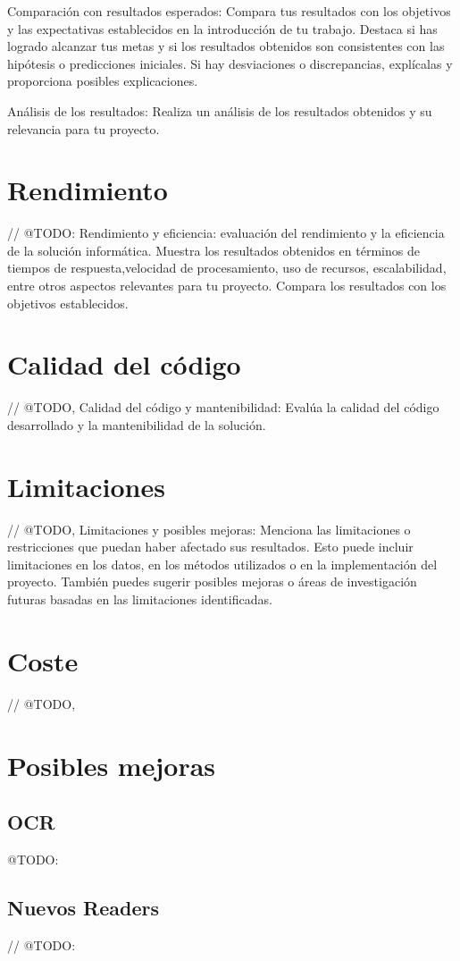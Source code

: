 Comparación con resultados esperados: Compara tus resultados con los objetivos
y las expectativas establecidos en la introducción de tu trabajo.
Destaca si has logrado alcanzar tus metas y si los resultados obtenidos son consistentes con las hipótesis o
predicciones iniciales.
Si hay desviaciones o discrepancias, explícalas y proporciona posibles explicaciones.

Análisis de los resultados: Realiza un análisis de los resultados obtenidos y su relevancia para tu proyecto.


\section{Rendimiento}

// @TODO: Rendimiento y eficiencia: evaluación del rendimiento y la eficiencia de la solución informática.
Muestra los resultados obtenidos en términos de tiempos de respuesta,velocidad de procesamiento, uso de recursos,
escalabilidad, entre otros aspectos relevantes para tu proyecto.
Compara los resultados con los objetivos establecidos.


\section{Calidad del código}

// @TODO, Calidad del código y mantenibilidad:
Evalúa la calidad del código desarrollado y la mantenibilidad de la solución.


\section{Limitaciones}

// @TODO, Limitaciones y posibles mejoras: Menciona las limitaciones o restricciones
que puedan haber afectado sus resultados.
Esto puede incluir limitaciones en los datos, en los métodos utilizados o en la implementación del proyecto.
También puedes sugerir posibles mejoras o áreas de investigación futuras basadas en las limitaciones identificadas.


\section{Coste}
// @TODO,


\section{Posibles mejoras}

\subsection*{OCR}
\colorbox{color_highlight}{@TODO:}

\subsection*{Nuevos Readers}
// @TODO:
